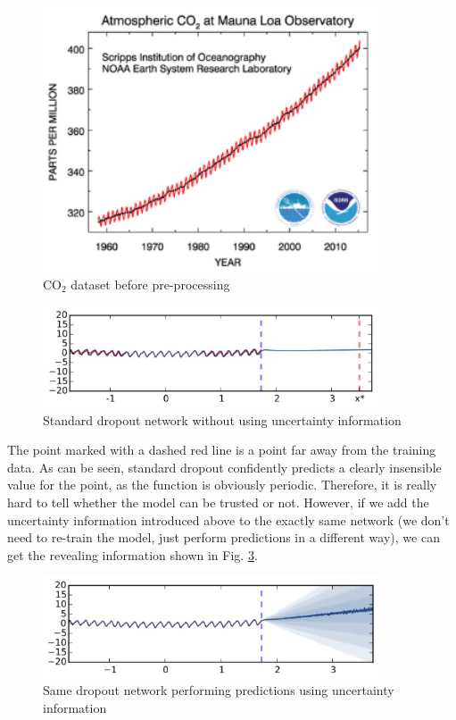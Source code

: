 \begin{figure}[H]
    \centering
    \includegraphics[width=10cm]{labs/12/images/CO2 concentration.png}
    \caption{CO$_2$ dataset before pre-processing}
    \label{fig:co2_concentration}
\end{figure}

\begin{figure}[H]
    \centering
    \includegraphics[width=10cm]{labs/12/images/Regression without uncertainty.png}
    \caption{Standard dropout network without using uncertainty information}
    \label{fig:regression_without_uncertainty}
\end{figure}

The point marked with a dashed red line is a point far away from the training data. As can be seen, standard dropout confidently predicts a clearly insensible value for the point, as the function is obviously periodic. Therefore, it is really hard to tell whether the model can be trusted or not. However, if we add the uncertainty information introduced above to the exactly same network (we don't need to re-train the model, just perform predictions in a different way), we can get the revealing information shown in Fig. \ref{fig:regression_with_uncertainty}.

\begin{figure}[H]
    \centering
    \includegraphics[width=10cm]{labs/12/images/Regression with uncertainty.png}
    \caption{Same dropout network performing predictions using uncertainty information}
    \label{fig:regression_with_uncertainty}
\end{figure}

